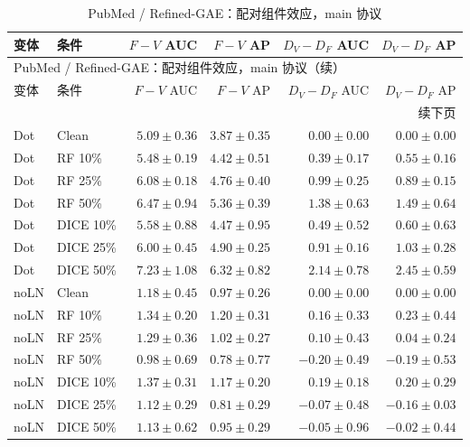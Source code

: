 {\footnotesize
\setlength{\tabcolsep}{3.2pt}
\renewcommand{\arraystretch}{1.10}
\begin{longtable}{llrrrr}
\caption{PubMed / Refined-GAE：配对组件效应，main 协议}\\
\toprule
变体 & 条件 & $F-V$ AUC & $F-V$ AP & $D_V-D_F$ AUC & $D_V-D_F$ AP \\
\midrule
\endfirsthead
\multicolumn{6}{l}{PubMed / Refined-GAE：配对组件效应，main 协议（续）}\\
\toprule
变体 & 条件 & $F-V$ AUC & $F-V$ AP & $D_V-D_F$ AUC & $D_V-D_F$ AP \\
\midrule
\endhead
\midrule\multicolumn{6}{r}{续下页}\\
\endfoot
\bottomrule
\endlastfoot
Dot & Clean & $5.09\pm0.36$ & $3.87\pm0.35$ & $0.00\pm0.00$ & $0.00\pm0.00$ \\
Dot & RF 10\% & $5.48\pm0.19$ & $4.42\pm0.51$ & $0.39\pm0.17$ & $0.55\pm0.16$ \\
Dot & RF 25\% & $6.08\pm0.18$ & $4.76\pm0.40$ & $0.99\pm0.25$ & $0.89\pm0.15$ \\
Dot & RF 50\% & $6.47\pm0.94$ & $5.36\pm0.39$ & $1.38\pm0.63$ & $1.49\pm0.64$ \\
Dot & DICE 10\% & $5.58\pm0.88$ & $4.47\pm0.95$ & $0.49\pm0.52$ & $0.60\pm0.63$ \\
Dot & DICE 25\% & $6.00\pm0.45$ & $4.90\pm0.25$ & $0.91\pm0.16$ & $1.03\pm0.28$ \\
Dot & DICE 50\% & $7.23\pm1.08$ & $6.32\pm0.82$ & $2.14\pm0.78$ & $2.45\pm0.59$ \\
noLN & Clean & $1.18\pm0.45$ & $0.97\pm0.26$ & $0.00\pm0.00$ & $0.00\pm0.00$ \\
noLN & RF 10\% & $1.34\pm0.20$ & $1.20\pm0.31$ & $0.16\pm0.33$ & $0.23\pm0.44$ \\
noLN & RF 25\% & $1.29\pm0.36$ & $1.02\pm0.27$ & $0.10\pm0.43$ & $0.04\pm0.24$ \\
noLN & RF 50\% & $0.98\pm0.69$ & $0.78\pm0.77$ & $-0.20\pm0.49$ & $-0.19\pm0.53$ \\
noLN & DICE 10\% & $1.37\pm0.31$ & $1.17\pm0.20$ & $0.19\pm0.18$ & $0.20\pm0.29$ \\
noLN & DICE 25\% & $1.12\pm0.29$ & $0.81\pm0.29$ & $-0.07\pm0.48$ & $-0.16\pm0.03$ \\
noLN & DICE 50\% & $1.13\pm0.62$ & $0.95\pm0.29$ & $-0.05\pm0.96$ & $-0.02\pm0.44$ \\
\end{longtable}
}

